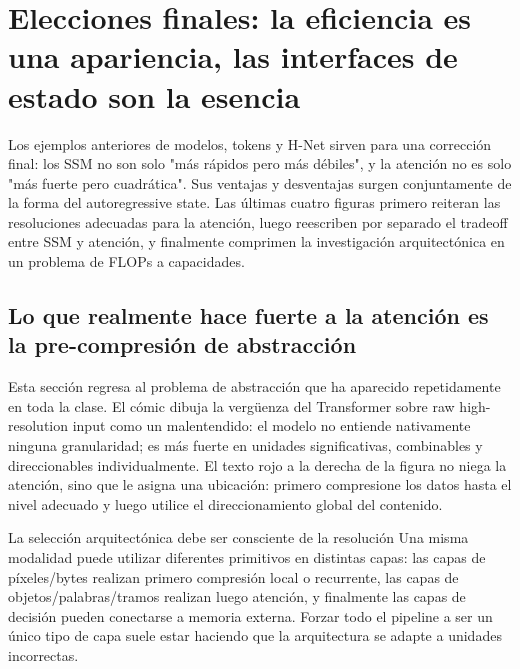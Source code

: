 \section{Elecciones finales: la eficiencia es una apariencia, las interfaces de estado son la esencia}

Los ejemplos anteriores de modelos, tokens y H-Net sirven para una corrección final: los SSM no son solo "más rápidos pero más débiles", y la atención no es solo "más fuerte pero cuadrática". Sus ventajas y desventajas surgen conjuntamente de la forma del autoregressive state. Las últimas cuatro figuras primero reiteran las resoluciones adecuadas para la atención, luego reescriben por separado el tradeoff entre SSM y atención, y finalmente comprimen la investigación arquitectónica en un problema de FLOPs a capacidades.

\subsection{Lo que realmente hace fuerte a la atención es la pre-compresión de abstracción}

Esta sección regresa al problema de abstracción que ha aparecido repetidamente en toda la clase. El cómic dibuja la vergüenza del Transformer sobre raw high-resolution input como un malentendido: el modelo no entiende nativamente ninguna granularidad; es más fuerte en unidades significativas, combinables y direccionables individualmente. El texto rojo a la derecha de la figura no niega la atención, sino que le asigna una ubicación: primero compresione los datos hasta el nivel adecuado y luego utilice el direccionamiento global del contenido.


\begin{importantbox}{La selección arquitectónica debe ser consciente de la resolución}
Una misma modalidad puede utilizar diferentes primitivos en distintas capas: las capas de píxeles/bytes realizan primero compresión local o recurrente, las capas de objetos/palabras/tramos realizan luego atención, y finalmente las capas de decisión pueden conectarse a memoria externa. Forzar todo el pipeline a ser un único tipo de capa suele estar haciendo que la arquitectura se adapte a unidades incorrectas.
\end{importantbox}

